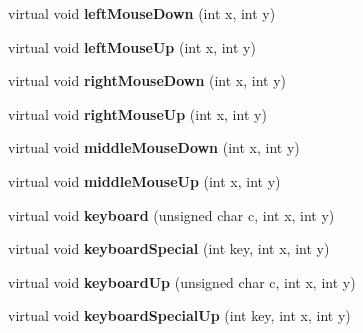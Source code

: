 \begin{DoxyCompactItemize}
\item 
virtual void {\bfseries left\+Mouse\+Down} (int x, int y)\hypertarget{classBaseGfxApp_aaaccf5a5e923a9465441a5ee712424a8}{}\label{classBaseGfxApp_aaaccf5a5e923a9465441a5ee712424a8}

\item 
virtual void {\bfseries left\+Mouse\+Up} (int x, int y)\hypertarget{classBaseGfxApp_a0a2961a932b02b2f9d7d0bb408f6fb51}{}\label{classBaseGfxApp_a0a2961a932b02b2f9d7d0bb408f6fb51}

\item 
virtual void {\bfseries right\+Mouse\+Down} (int x, int y)\hypertarget{classBaseGfxApp_afa87e6a71220945e41f0424e540125d9}{}\label{classBaseGfxApp_afa87e6a71220945e41f0424e540125d9}

\item 
virtual void {\bfseries right\+Mouse\+Up} (int x, int y)\hypertarget{classBaseGfxApp_a812643d563522a993457dd565c33f8f6}{}\label{classBaseGfxApp_a812643d563522a993457dd565c33f8f6}

\item 
virtual void {\bfseries middle\+Mouse\+Down} (int x, int y)\hypertarget{classBaseGfxApp_a2c98cae9bb5ad1fb1832a6d4812670f8}{}\label{classBaseGfxApp_a2c98cae9bb5ad1fb1832a6d4812670f8}

\item 
virtual void {\bfseries middle\+Mouse\+Up} (int x, int y)\hypertarget{classBaseGfxApp_a00fc05e8d9629b72302b5adf014bdb0c}{}\label{classBaseGfxApp_a00fc05e8d9629b72302b5adf014bdb0c}

\item 
virtual void {\bfseries keyboard} (unsigned char c, int x, int y)\hypertarget{classBaseGfxApp_a6d91e0cb7a3d48cad33956efe7eb36ca}{}\label{classBaseGfxApp_a6d91e0cb7a3d48cad33956efe7eb36ca}

\item 
virtual void {\bfseries keyboard\+Special} (int key, int x, int y)\hypertarget{classBaseGfxApp_a345566e62c9e4ec3705ec4d1c4c75f1f}{}\label{classBaseGfxApp_a345566e62c9e4ec3705ec4d1c4c75f1f}

\item 
virtual void {\bfseries keyboard\+Up} (unsigned char c, int x, int y)\hypertarget{classBaseGfxApp_acc4a40ce11edd6b6660a19cb4802a2bf}{}\label{classBaseGfxApp_acc4a40ce11edd6b6660a19cb4802a2bf}

\item 
virtual void {\bfseries keyboard\+Special\+Up} (int key, int x, int y)\hypertarget{classBaseGfxApp_afd14b435ff93b1e7f461cb8bd1a6fd59}{}\label{classBaseGfxApp_afd14b435ff93b1e7f461cb8bd1a6fd59}


\end{DoxyCompactItemize}

